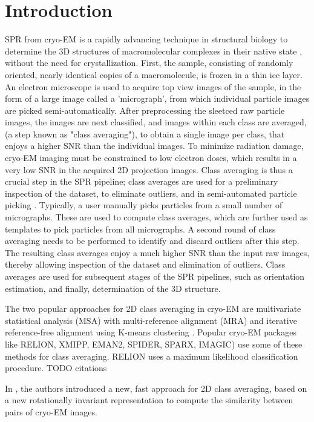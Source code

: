\documentclass{article}
\begin{document}
\section{Introduction}
\label{sec:intro}
SPR from cryo-EM is a rapidly advancing technique in structural biology to determine
the 3D structures of macromolecular complexes in their native state \cite{Frank1, Kuhlbrandt1443},
 without the need for crystallization. First, the sample, consisting of randomly oriented, nearly identical copies of a macromolecule, is frozen in a thin ice layer. An electron microscope is used to acquire top view images of the sample, in the form of a large image called a 'micrograph', from which individual particle images are picked semi-automatically. After preprocessing the sleetced raw particle images, the images are next classified, and images within each class are averaged, (a step known as "class averaging"), to obtain a single image per class, that enjoys a higher SNR than the individual images. To minimize radiation damage, cryo-EM imaging must be constrained to low electron doses, which results in a very low SNR in the acquired 2D projection images. Class averaging is thus a crucial step in the SPR pipeline; class averages are used for a preliminary inspection of the dataset, to eliminate outliers, and in semi-automated particle picking \cite{relion}. Typically, a user manually picks particles from a small number of micrographs. These are used to compute class averages, which are further used as templates to pick particles from all micrographs. A second round of class averaging needs to be performed to identify and discard outliers after this step. The resulting class averages enjoy a much higher SNR than the input raw images, thereby allowing inspection of the dataset and elimination of outliers. Class averages are used for subsequent stages of the SPR pipelines, such as orientation estimation, and finally, determination of the 3D structure.
 
The two popular approaches for 2D class averaging \cite{Penczek1992,Penczek1996, vanHeel1990a, vanHeel1981} in cryo-EM are multivariate statistical analysis (MSA)\cite{vanHeel1981} with multi-reference alignment (MRA) \cite{Dube1993} and iterative reference-free alignment using K-means clustering \cite{Penczek1996}. Popular cryo-EM packages like RELION, XMIPP, EMAN2, SPIDER, SPARX, IMAGIC) use some of these methods for class averaging. RELION uses a maximum likelihood classification procedure. {\color{red} TODO citations}  

In \cite{zhao}, the authors introduced a new, fast approach for 2D class averaging, based on a new rotationally invariant representation to compute the similarity between pairs of cryo-EM images.
\end{document}
